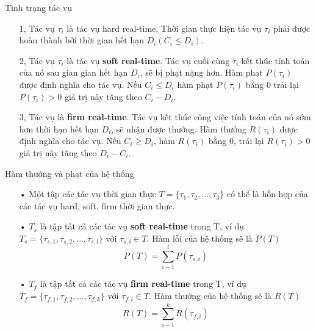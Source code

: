 \documentclass{beamer}
\begin{document}
\begin{frame}{Tình trạng tác vụ}
\begin{itemize}
\item[1, ] Tác vụ $\tau_i$ là tác vụ hard real-time. Thời gian thực hiện tác vụ $\tau_i$ phải được hoàn thành bởi thời gian hết hạn $D_i ( C_i \leq D_i )$.
\item[2, ] Tác vụ $\tau_i$ là tác vụ \textbf{soft real-time}. Tác vụ cuối cùng $\tau_i$ kết thúc tính toán của nó sau gian gian hết hạn $D_i$, sẽ bị phạt nặng hơn. Hàm phạt $P(\tau_i)$ được định nghĩa cho tác vụ. Nếu $C_i \leq D_i$ hàm phạt $P(\tau_i)$ bằng 0 trái lại $P(\tau_i) > 0$ giá trị này tăng theo $C_i - D_i$.
\item[3, ] Tác vụ là \textbf{firm real-time}. Tác vụ kết thúc công việc tính toán của nó sớm hơn thời hạn hết hạn $D_i$, sẽ nhận được thưởng. Hàm thưởng $R(\tau_i)$ được định nghĩa cho tác vụ. Nếu $C_i \geq D_i$, hàm $R(\tau_i)$ bằng 0, trái lại $R(\tau_i) > 0$ giá trị này tăng theo $D_i - C_i$.
\end{itemize}
\end{frame}
\begin{frame}{Hàm thưởng và phạt của hệ thống}
\begin{itemize}
\item[•] Một tập các tác vụ thời gian thực $T = \{\tau_1, \tau_2, \ldots , \tau_3\}$ có thể là hỗn hợp của các tác vụ hard, soft, firm thời gian thực.
\item[•] $T_s$ là tập tất cả các tác vụ \textbf{soft real-time} trong T, ví dụ $T_s = \{\tau_{s,1}, \tau_{s,2}, \ldots , \tau_{s,l}\}$ với $\tau_{s,i} \in T$. Hàm lỗi của hệ thống sẽ là $P(T)$
\begin{displaymath}
P(T) = \sum_{i-1}^{l} P(\tau_{s,i})
\end{displaymath}
\item[•] $T_f$ là tập tất cả các tác vụ \textbf{firm real-time} trong T, ví dụ $T_f = \{\tau_{f,1}, \tau_{f,2}, \ldots , \tau_{f,k}\}$ với $\tau_{f,i} \in T$. Hàm thưởng của hệ thống sẽ là $R(T)$
\begin{displaymath}
R(T) = \sum_{i-1}^{k} R(\tau_{f,i})
\end{displaymath}
\end{itemize}
\end{frame}
\end{document}
